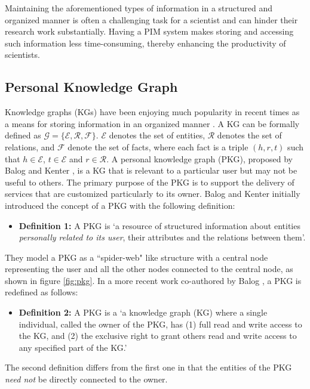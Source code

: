 \documentclass[11pt,pdftex]{article}
\begin{document}
Maintaining the aforementioned types of information in a structured and organized manner is often a challenging task for a scientist and can hinder their research work substantially. Having a PIM system makes storing and accessing such information less time-consuming, thereby enhancing the productivity of scientists.

\subsection{Personal Knowledge Graph}
Knowledge graphs (KGs) have been enjoying much popularity in recent times as a means for storing information in an organized manner \cite{ji2021survey,chaudhri2022knowledge}. A KG can be formally defined \cite{ehrlinger2016towards} as $\mathcal{G} = \{\mathcal{E}, \mathcal{R}, \mathcal{F}\}$. $\mathcal{E}$ denotes the set of entities, $\mathcal{R}$ denotes the set of relations, and $\mathcal{F}$ denote the set of facts, where each fact is a triple $(h, r, t)$ such that $h \in \mathcal{E}$, $t \in \mathcal{E}$ and $r \in \mathcal{R}$. 
A personal knowledge graph (PKG), proposed by Balog and Kenter  \cite{balog2019personal}, is a KG that is relevant to a particular user but may not be useful to others. The primary purpose of the PKG is to support the delivery of services that are customized particularly to its owner. 
Balog and Kenter \cite{balog2019personal} initially introduced the concept of a PKG with the following definition: 
\begin{itemize}
    \item[] \textbf{Definition 1:} A PKG is `a resource of structured information about entities \textit{personally related to its user}, their attributes and the relations between them'.
\end{itemize}
They model a PKG as a ``spider-web" like structure with a central node representing the user and all the other nodes connected to the central node, as shown in figure \ref{fig:pkg}.
In a more recent work co-authored by Balog  \cite{skjaeveland2023ecosystem}, a PKG is redefined as follows:
\begin{itemize}
    \item[] \textbf{Definition 2:} A PKG is a `a knowledge graph (KG) where a single individual, called the owner of the PKG, has (1) full read and write access to the KG, and (2) the exclusive right to grant others read and write access to any specified part of the KG.' 
\end{itemize}
The second definition differs from the first one in that the entities of the PKG \textit{need not} be directly connected to the owner.
\end{document}

